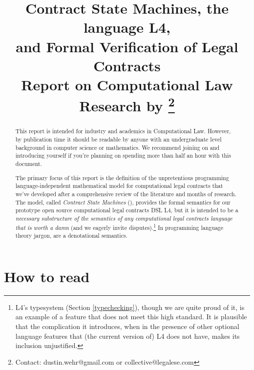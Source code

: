 \documentclass[12pt]{article}
\title{Contract State Machines, the language L4,\\
and Formal Verification of Legal Contracts \\
\smaller \smaller Report on Computational Law Research by \extlink{https://legalese.com}{Legalese}\footnote{Contact: dustin.wehr@gmail.com or collective@legalese.com}\larger \larger }
\newcommand{\termz}[2]{\EM{\textsf{\hyperref[#1]{#2}}}\xspace}
\newcommand{\lsmslong}{Contract State Machines\xspace}
\newcommand{\lsms}{\texorpdfstring{\termz{lsm}{CSMs}}{CSMs}}
\begin{document}
\maketitle

\begin{abstract}
This report is intended for industry and academics in Computational Law. However, by publication time it should be readable by anyone with an undergraduate level background in computer science or mathematics. We recommend joining  on  and introducing yourself if you're planning on spending more than half an hour with this document. %

The primary focus of this report is the definition of the unpretentious programming language-independent mathematical model for computational legal contracts that we've developed after a comprehensive review of the literature and months of research. The model, called \textit{\lsmslong} (\lsms), provides the formal semantics for our prototype open source computational legal contracts DSL L4, but it is intended to be a \textit{necessary substructure of the semantics of any computational legal contracts language that is worth a damn} (and we eagerly invite disputes).\footnote{L4's typesystem (Section \ref{typechecking}), though we are quite proud of it, is an example of a feature that does not meet this high standard. It is plausible that the complication it introduces, when in the presence of other optional language features that (the current version of) L4 does not have, makes its inclusion unjustified.}
In programming language theory jargon, \lsms are a denotational semantics.
\end{abstract}
\pagebreak

\tableofcontents

\section{How to read}
\end{document}

